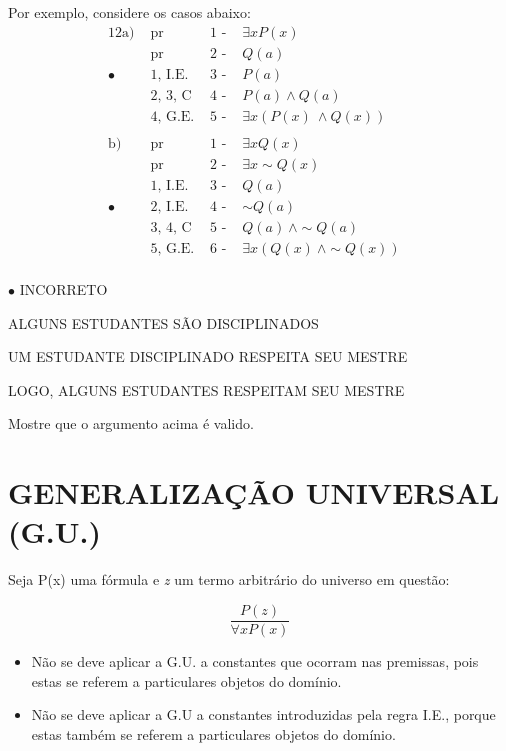 Por exemplo, considere os casos abaixo:
\begin{alignat*}{12}
    \text{a) } & \text{pr}       & \text{1 - } & \exists x P(x) &\\
               & \text{pr}       & \text{2 - } & Q(a) &\\
               \bullet\;  & \text{1, I.E. } & \text{3 - } & P(a) &\\
               & \text{2, 3, C } & \text{4 - } & P(a) \land Q(a) &\\
               & \text{4, G.E. } & \text{5 - } & \exists x (P(x)\ \land Q(x)) &\\
               & & & &\\ %
    \text{b) } & \text{pr}       & \text{1 - } & \exists x Q(x) &\\
               & \text{pr}       & \text{2 - } & \exists x \sim Q(x) &\\
               & \text{1, I.E. } & \text{3 - } & Q(a) &\\
    \bullet\;  & \text{2, I.E. } & \text{4 - } & \sim Q(a) &\\
               & \text{3, 4, C } & \text{5 - } & Q(a)\ \land \sim Q(a) &\\
               & \text{5, G.E. } & \text{6 - } & \exists x (Q(x)\ \land \sim Q(x)) &\\
            \end{alignat*}

$\bullet$ INCORRETO

\begin{exemplo}
    \leavevmode

    ALGUNS ESTUDANTES SÃO DISCIPLINADOS

    UM ESTUDANTE DISCIPLINADO RESPEITA SEU MESTRE

    LOGO, ALGUNS ESTUDANTES RESPEITAM SEU MESTRE
\end{exemplo}

\noindent Mostre que o argumento acima é valido.

\section{GENERALIZAÇÃO UNIVERSAL (G.U.)}
Seja P(x) uma fórmula e \textit{z} um termo arbitrário do universo em questão:

\[
\boxed{\frac{P(z)}{\forall x P(x)}}
\]

\begin{itemize}
    \item Não se deve aplicar a G.U. a constantes que ocorram nas premissas, pois estas se referem a particulares objetos do domínio.

    \item Não se deve aplicar a G.U a constantes introduzidas pela regra I.E., porque estas também se referem a particulares objetos do domínio.
\end{itemize}

